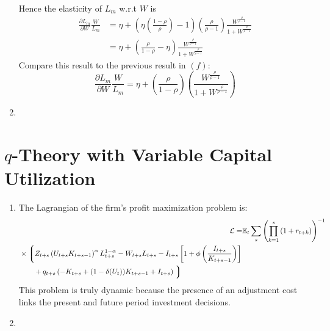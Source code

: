 \documentclass[11pt]{amsart}
\begin{document}
\begin{enumerate}[label = (\alph*)]
\begin{equation*}
	\end{equation*}
	Hence the elasticity of $L_m$ w.r.t $W$ is
	\begin{align*}
	\frac{\partial L_m}{\partial W} \frac{W}{L_m} &= \eta + \left( \eta \left( \frac{1-\rho}{\rho} \right) -1  \right) \left( \frac{\rho}{\rho-1} \right) \frac{W^{\frac{\rho}{\rho-1}}}{1 + W^{\frac{\rho}{\rho-1}}} \\
	& = \eta + \left(  \frac{\rho}{1-\rho} - \eta \right) \frac{W^{\frac{\rho}{\rho-1}}}{1 + W^{\frac{\rho}{\rho-1}}}
	\end{align*}
	Compare this result to the previous result in $(f)$:
	\begin{equation*}
	\frac{\partial L_m}{\partial W} \frac{W}{L_m} = \eta + \left( \frac{\rho}{1-\rho} \right) \left( \frac{W^{\frac{\rho}{\rho-1}}}{1 + W^{\frac{\rho}{\rho-1}}} \right)
	\end{equation*}
	\item

\end{enumerate}

\section{$q$-Theory with Variable Capital Utilization}
\begin{enumerate}[label = (\alph*)]
	\item The Lagrangian of the firm's profit maximization problem is: 
	\begin{align*}
	\mathcal{L} =& \mathbb{E}_t \sum_{s} \left( \prod_{k=1}^{s} \left(1 + r_{t+k} \right) \right)^{-1} \\
	\begin{split}
	&\times \left\lgroup  Z_{t+s} \left( U_{t+s} K_{t+s-1}  \right)^{\alpha} L_{t+s}^{1-\alpha}  - W_{t+s} L_{t+s} - I_{t+s} \left[ 1 + \phi \left( \frac{I_{t+s}}{K_{t+s-1}} \right) \right] \right. \\
	& \qquad + q_{t+s} \left( -K_{t+s} + (1-\delta(U_t))K_{t+s-1} + I_{t+s} \right) \left. \right\rgroup
	\end{split}
	\end{align*}
	This problem is truly dynamic because the presence of an adjustment cost links the present and future period investment decisions. 
	\item 
\end{enumerate}
\end{document}
